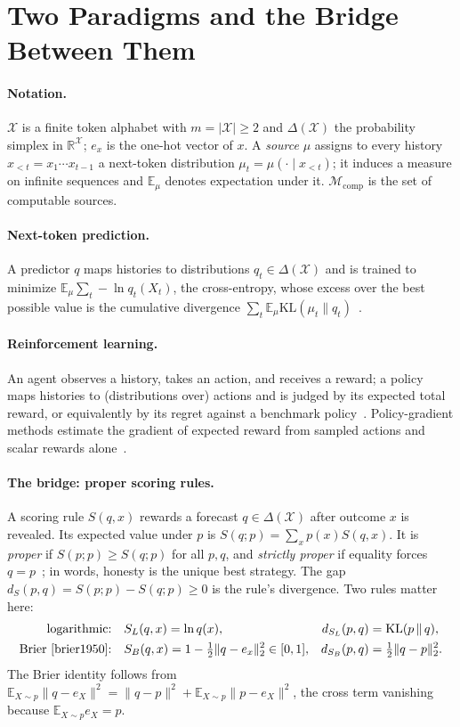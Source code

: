 \documentclass[11pt]{article}
\theoremstyle{definition}
\newcommand{\X}{\mathcal{X}}
\newcommand{\Del}{\Delta(\X)}
\newcommand{\E}{\mathbb{E}}
\newcommand{\R}{\mathbb{R}}
\newcommand{\KL}{\mathrm{KL}}
\newcommand{\Mcomp}{\mathcal{M}_{\mathrm{comp}}}
\begin{document}
\section{Two Paradigms and the Bridge Between Them}\label{sec:background}

\paragraph{Notation.} $\X$ is a finite token alphabet with $m=|\X|\ge2$ and $\Del$ the probability simplex in $\R^\X$; $e_x$ is the one-hot vector of $x$. A \emph{source} $\mu$ assigns to every history $x_{<t}=x_1\cdots x_{t-1}$ a next-token distribution $\mu_t=\mu(\cdot\mid x_{<t})$; it induces a measure on infinite sequences and $\E_\mu$ denotes expectation under it. $\Mcomp$ is the set of computable sources.

\paragraph{Next-token prediction.} A predictor $q$ maps histories to distributions $q_t\in\Del$ and is trained to minimize $\E_\mu\sum_t-\ln q_t(X_t)$, the cross-entropy, whose excess over the best possible value is the cumulative divergence $\sum_t\E_\mu\KL(\mu_t\|q_t)$~\cite{shannon1948}.

\paragraph{Reinforcement learning.} An agent observes a history, takes an action, and receives a reward; a policy maps histories to (distributions over) actions and is judged by its expected total reward, or equivalently by its regret against a benchmark policy~\cite{sutton2018}. Policy-gradient methods estimate the gradient of expected reward from sampled actions and scalar rewards alone~\cite{williams1992reinforce}.

\paragraph{The bridge: proper scoring rules.} A scoring rule $S(q,x)$ rewards a forecast $q\in\Del$ after outcome $x$ is revealed. Its expected value under $p$ is $S(q;p)=\sum_xp(x)S(q,x)$. It is \emph{proper} if $S(p;p)\ge S(q;p)$ for all $p,q$, and \emph{strictly proper} if equality forces $q=p$~\cite{savage1971,gneiting2007}; in words, honesty is the unique best strategy. The gap $d_S(p,q)=S(p;p)-S(q;p)\ge0$ is the rule's divergence. Two rules matter here:
\begin{align}
\text{logarithmic:}\quad & S_L(q,x)=\ln q(x), & d_{S_L}(p,q)&=\KL(p\,\|\,q),\label{eq:log}\\
\text{Brier~\cite{brier1950}:}\quad & S_B(q,x)=1-\tfrac12\|q-e_x\|_2^2\in[0,1], & d_{S_B}(p,q)&=\tfrac12\|q-p\|_2^2.\label{eq:brier}
\end{align}
The Brier identity follows from $\E_{X\sim p}\|q-e_X\|^2=\|q-p\|^2+\E_{X\sim p}\|p-e_X\|^2$, the cross term vanishing because $\E_{X\sim p}e_X=p$.
\end{document}
